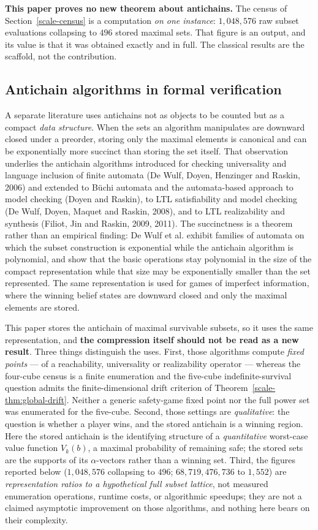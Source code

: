\documentclass[10pt,twocolumn]{article}
\theoremstyle{plain}
\theoremstyle{definition}
\theoremstyle{remark}
\begin{document}
\textbf{This paper proves no new theorem about antichains.} The census of
Section~\ref{scale-census} is a computation \emph{on one instance}: \(1{,}048{,}576\) raw subset
evaluations collapsing to \(496\) stored maximal sets. That figure is an output, and its
value is that it was obtained exactly and in full. The classical results are the scaffold,
not the contribution.

\subsection{Antichain algorithms in formal verification}

A separate literature uses antichains not as objects to be counted but as a compact
\emph{data structure}. When the sets an algorithm manipulates are downward closed under a
preorder, storing only the maximal elements is canonical and can be exponentially more succinct
than storing the set itself. That observation underlies the antichain algorithms introduced for
checking universality and language inclusion of finite automata (De Wulf, Doyen, Henzinger and
Raskin, 2006) and extended to B\"uchi automata and the automata-based approach to model
checking (Doyen and Raskin), to LTL satisfiability and model checking (De Wulf, Doyen, Maquet
and Raskin, 2008), and to LTL realizability and synthesis (Filiot, Jin and Raskin, 2009, 2011).
The succinctness is a theorem rather than an empirical finding: De Wulf et al. exhibit families
of automata on which the subset construction is exponential while the antichain algorithm is
polynomial, and show that the basic operations stay polynomial in the size of the compact
representation while that size may be exponentially smaller than the set represented. The same
representation is used for games of imperfect information, where the winning belief states are
downward closed and only the maximal elements are stored.

This paper stores the antichain of maximal survivable subsets, so it uses the same
representation, and \textbf{the compression itself should not be read as a new result}. Three
things distinguish the uses. First, those algorithms compute \emph{fixed points} --- of a
reachability, universality or realizability operator --- whereas the four-cube census is a finite enumeration and the five-cube
indefinite-survival question admits the finite-dimensional drift criterion
of Theorem~\ref{scale-thm:global-drift}. Neither a generic safety-game
fixed point nor the full power set was enumerated for the five-cube.
Second, those settings are \emph{qualitative}: the question is whether a player wins, and the
stored antichain is a winning region. Here the stored antichain is the identifying structure of
a \emph{quantitative} worst-case value function \(V_k(b)\), a maximal probability of remaining
safe; the stored sets are the supports of its \(\alpha\)-vectors rather than a winning set.
Third, the figures reported below (\(1{,}048{,}576\) collapsing to \(496\);
\(68{,}719{,}476{,}736\) to \(1{,}552\)) are \emph{representation ratios to a hypothetical full subset lattice}, not
measured enumeration operations, runtime costs, or algorithmic speedups; they are not a claimed asymptotic
improvement on those algorithms, and nothing here bears on their complexity.
\end{document}
